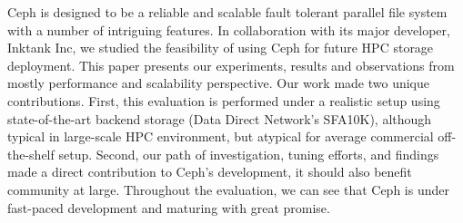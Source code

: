 
Ceph is designed to be a reliable and scalable fault tolerant parallel file
system with a number of intriguing features. In collaboration with its major
developer, Inktank Inc, we studied the feasibility of using Ceph for future
HPC storage deployment. This paper presents our experiments, results and
observations from mostly performance and scalability perspective. Our work
made two unique contributions. First, this evaluation is performed under a
realistic setup using state-of-the-art backend storage (Data Direct Network's
SFA10K),  although typical in large-scale HPC environment, but atypical for
average commercial off-the-shelf setup.  Second, our path of investigation,
tuning efforts, and findings made a direct contribution to Ceph's development,
it should also benefit community at large. Throughout the evaluation, we can
see that Ceph is under fast-paced development and maturing with great promise. 
